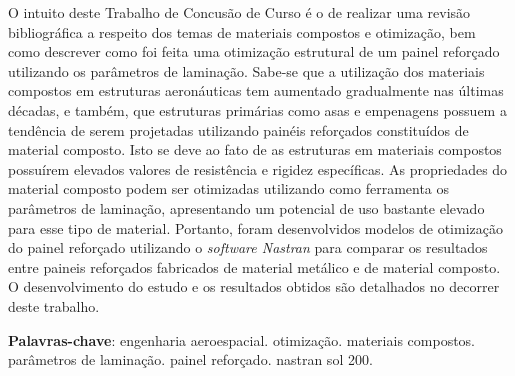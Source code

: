 \setlength{\absparsep}{18pt} %
\begin{resumo}

 O intuito deste Trabalho de Concusão de Curso é o de realizar uma revisão bibliográfica a respeito dos temas de materiais compostos e otimização, bem como descrever como foi feita uma otimização estrutural de um painel reforçado utilizando os parâmetros de laminação. Sabe-se que a utilização dos materiais compostos em estruturas aeronáuticas tem aumentado gradualmente nas últimas décadas, e também, que estruturas primárias como asas e empenagens possuem a tendência de serem projetadas utilizando painéis reforçados constituídos de material composto. Isto se deve ao fato de as estruturas em materiais compostos possuírem elevados valores de resistência e rigidez específicas. As propriedades do material composto podem ser otimizadas utilizando como ferramenta os parâmetros de laminação, apresentando um potencial de uso bastante elevado para esse tipo de material. Portanto, foram desenvolvidos modelos de otimização do painel reforçado utilizando o \emph{software Nastran} para comparar os resultados entre paineis reforçados fabricados de material metálico e de material composto. O desenvolvimento do estudo e os resultados obtidos são detalhados no decorrer deste trabalho.


 \textbf{Palavras-chave}: engenharia aeroespacial. otimização. materiais compostos. parâmetros de laminação. painel reforçado. nastran sol 200.
\end{resumo}

